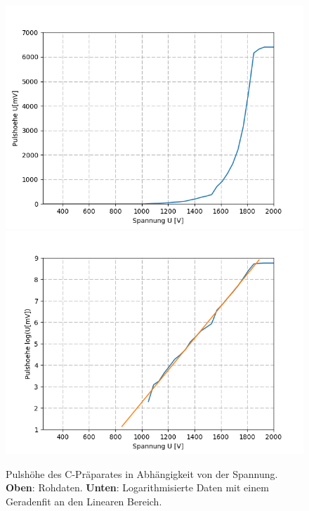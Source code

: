 \documentclass[12pt,a4paper]{article}
\begin{document}
\begin{figure}
\centering
\includegraphics[scale=0.8]{Bilder/Prop/C_Puls_lin.PNG}
\includegraphics[scale=0.8]{Bilder/Prop/C_Puls_exp.PNG}
\caption{Pulshöhe des C-Präparates in Abhängigkeit von der Spannung. \textbf{Oben}: Rohdaten. \textbf{Unten}: Logarithmisierte Daten mit einem Geradenfit an den Linearen Bereich.}
\label{fig:CPulse}
\end{figure}
\end{document}
